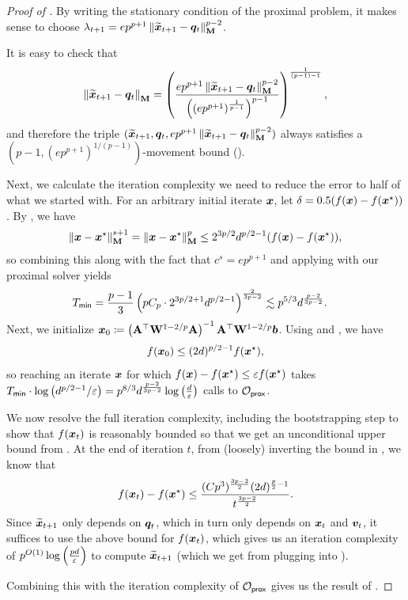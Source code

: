 \begin{proof}[Proof of ]
By writing the stationary condition of the proximal problem, it makes sense to choose $\lambda_{t+1} = ep^{p+1}\left\lVert \widetilde{\bm{x}}_{t+1}-\bm{q}_t \right\rVert_{\mathbf{M}}^{p-2}$.

It is easy to check that
\begin{align*}
    \left\lVert \widetilde{\bm{x}}_{t+1}-\bm{q}_t \right\rVert_{\mathbf{M}} = \left(\frac{ep^{p+1}\left\lVert \widetilde{\bm{x}}_{t+1}-\bm{q}_t \right\rVert_{\mathbf{M}}^{p-2}}{\left((ep^{p+1})^{\frac{1}{p-1}}\right)^{p-1}}\right)^{\frac{1}{(p-1)-1}},
\end{align*}
and therefore the triple $(\widetilde{\bm{x}}_{t+1},\bm{q}_t,ep^{p+1}\left\lVert \widetilde{\bm{x}}_{t+1}-\bm{q}_t \right\rVert_{\mathbf{M}}^{p-2})$ always satisfies a $(p-1, (ep^{p+1})^{1/(p-1)})$-movement bound ().

Next, we calculate the iteration complexity we need to reduce the error to half of what we started with. For an arbitrary initial iterate $\bm{x}$, let $\delta = 0.5(f(\bm{x})-f(\bm{x}^{\star}))$. By , we have
\begin{align*}
    \left\lVert \bm{x}-\bm{x}^{\star} \right\rVert_{\mathbf{M}}^{s+1} = \left\lVert \bm{x}-\bm{x}^{\star} \right\rVert_{\mathbf{M}}^p \le 2^{3p/2}d^{p/2-1}(f(\bm{x})-f(\bm{x}^{\star})),
\end{align*}
so combining this along with the fact that $c^s=ep^{p+1}$ and applying  with our proximal solver  yields
\begin{align*}
    T_{\mathsf{min}} &= \frac{p-1}{3}\left(pC_p\cdot2^{3p/2+1}d^{p/2-1}\right)^{\frac{2}{3p-2}} \lesssim p^{5/3}d^{\frac{p-2}{3p-2}}.
\end{align*}
Next, we initialize $\bm{x}_0 \coloneqq \left(\mathbf{A}^{\top}\mathbf{W}^{1-2/p}\mathbf{A}\right)^{-1}\mathbf{A}^{\top}\mathbf{W}^{1-2/p}\bm{b}$. Using  and , we have
\begin{align*}
    f(\bm{x}_0) \le (2d)^{p/2-1}f(\bm{x}^{\star}),
\end{align*}
so reaching an iterate $\bm{x}$ for which $f(\bm{x})-f(\bm{x}^{\star}) \le \varepsilon f(\bm{x}^{\star})$ takes $T_{\mathsf{min}} \cdot \log\left(d^{p/2-1}/\varepsilon\right) = p^{8/3}d^{\frac{p-2}{3p-2}}\log\left(\frac{d}{\varepsilon}\right)$ calls to $\mathcal{O}_{\mathsf{prox}}$.

We now resolve the full iteration complexity, including the bootstrapping step to show that $f(\bm{x}_t)$ is reasonably bounded so that we get an unconditional upper bound from . At the end of iteration $t$, from (loosely) inverting the bound in , we know that
\begin{align*}
    f(\bm{x}_t)-f(\bm{x}^{\star})\le \frac{(Cp^3)^{\frac{3p-2}{2}}(2d)^{\frac{p}{2}-1}}{t^{\frac{3p-2}{2}}}.
\end{align*}
Since $\widetilde{\bm{x}}_{t+1}$ only depends on $\bm{q}_t$, which in turn only depends on $\bm{x}_t$ and $\bm{v}_t$, it suffices to use the above bound for $f(\bm{x}_t)$, which gives us an iteration complexity of $p^{O(1)}\log\left(\frac{pd}{\varepsilon}\right)$ to compute $\widetilde{\bm{x}}_{t+1}$ (which we get from plugging into ).

Combining this with the iteration complexity of $\mathcal{O}_{\mathsf{prox}}$ gives us the result of .
\end{proof}